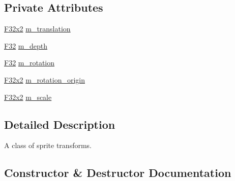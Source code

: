 \subsection*{Private Attributes}
\begin{DoxyCompactItemize}
\item 
\mbox{\hyperlink{namespacemage_a9dc0d34d6ecc87e4cfa4a826102117bc}{F32x2}} \mbox{\hyperlink{classmage_1_1_sprite_transform_a4006065eb65336fceffa36a5c2c45e59}{m\+\_\+translation}}
\item 
\mbox{\hyperlink{namespacemage_aa97e833b45f06d60a0a9c4fc22ae02c0}{F32}} \mbox{\hyperlink{classmage_1_1_sprite_transform_a646e129b2e9702eec23b4c673f07dfef}{m\+\_\+depth}}
\item 
\mbox{\hyperlink{namespacemage_aa97e833b45f06d60a0a9c4fc22ae02c0}{F32}} \mbox{\hyperlink{classmage_1_1_sprite_transform_a7c705543e7f6a9c7e7a517ffef2cb4b9}{m\+\_\+rotation}}
\item 
\mbox{\hyperlink{namespacemage_a9dc0d34d6ecc87e4cfa4a826102117bc}{F32x2}} \mbox{\hyperlink{classmage_1_1_sprite_transform_aa6a3a2653a00fb17116ce81979214e27}{m\+\_\+rotation\+\_\+origin}}
\item 
\mbox{\hyperlink{namespacemage_a9dc0d34d6ecc87e4cfa4a826102117bc}{F32x2}} \mbox{\hyperlink{classmage_1_1_sprite_transform_a2995048f52d8d90d003ea421d58772be}{m\+\_\+scale}}
\end{DoxyCompactItemize}


\subsection{Detailed Description}
A class of sprite transforms. 

\subsection{Constructor \& Destructor Documentation}
\mbox{\label{classmage_1_1_sprite_transform_a8d3760699d035e6315218bb6b589a2cb}} 
